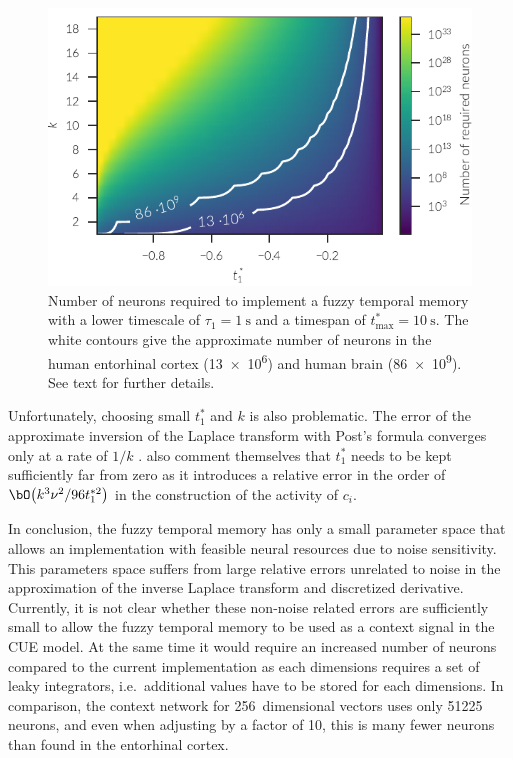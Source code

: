 \begin{figure}
    \centering
    \includegraphics{figures/fuzzy-mem-n-neurons}
    \caption[Number of neurons required to implement a fuzzy temporal memory.]{Number of neurons required to implement a fuzzy temporal memory with a lower timescale of $\tau_1 = \SI{1}{\second}$ and a timespan of $t^*_{\max} = \SI{10}{\second}$. The white contours give the approximate number of neurons in the human entorhinal cortex (\num{13e6}) and human brain (\num{86e9}). See text for further details.}\label{fig:fuzzy-mem-n-neurons}
\end{figure}

Unfortunately, choosing small $t^*_1$ and $k$ is also problematic.
The error of the approximate inversion of the Laplace transform with Post's formula converges only at a rate of $1/k$ \parencite{vukimtuan2000}.
\Textcite{shankar2013} also comment themselves that $t^*_1$ needs to be kept sufficiently far from zero as it introduces a relative error in the order of $\bO\big(k^3\nu^2/96 t^{*2}_1\big)$ in the construction of the activity of $c_i$.

In conclusion, the fuzzy temporal memory has only a small parameter space that allows an implementation with feasible neural resources due to noise sensitivity.
This parameters space suffers from large relative errors unrelated to noise in the approximation of the inverse Laplace transform and discretized derivative.
Currently, it is not clear whether these non-noise related errors are sufficiently small to allow the fuzzy temporal memory to be used as a context signal in the CUE model.
At the same time it would require an increased number of neurons compared to the current implementation as each dimensions requires a set of leaky integrators, i.e.\ additional values have to be stored for each dimensions.
In comparison, the context network for \num{256}~dimensional vectors uses only \num{51225} neurons, and even when adjusting by a factor of \num{10}, this is many fewer neurons than found in the entorhinal cortex.


